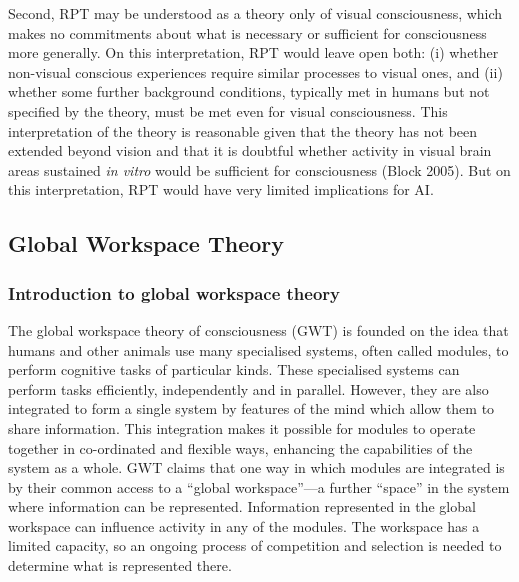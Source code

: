 \documentclass[12pt]{article}
\begin{document}
Second, RPT may be understood as a theory only of visual consciousness, which makes no commitments about what is necessary or sufficient for consciousness more generally. On this interpretation, RPT would leave open both: (i) whether non-visual conscious experiences require similar processes to visual ones, and (ii) whether some further background conditions, typically met in humans but not specified by the theory, must be met even for visual consciousness. This interpretation of the theory is reasonable given that the theory has not been extended beyond vision and that it is doubtful whether activity in visual brain areas sustained \textit{in vitro} would be sufficient for consciousness (Block 2005). But on this interpretation, RPT would have very limited implications for AI.

\subsection{Global Workspace Theory}
\subsubsection{Introduction to global workspace theory}

The global workspace theory of consciousness (GWT) is founded on the idea that humans and other animals use many specialised systems, often called modules, to perform cognitive tasks of particular kinds. These specialised systems can perform tasks efficiently, independently and in parallel. However, they are also integrated to form a single system by features of the mind which allow them to share information. This integration makes it possible for modules to operate together in co-ordinated and flexible ways, enhancing the capabilities of the system as a whole. GWT claims that one way in which modules are integrated is by their common access to a ``global workspace''—a further ``space'' in the system where information can be represented. Information represented in the global workspace can influence activity in any of the modules. The workspace has a limited capacity, so an ongoing process of competition and selection is needed to determine what is represented there.
\end{document}
